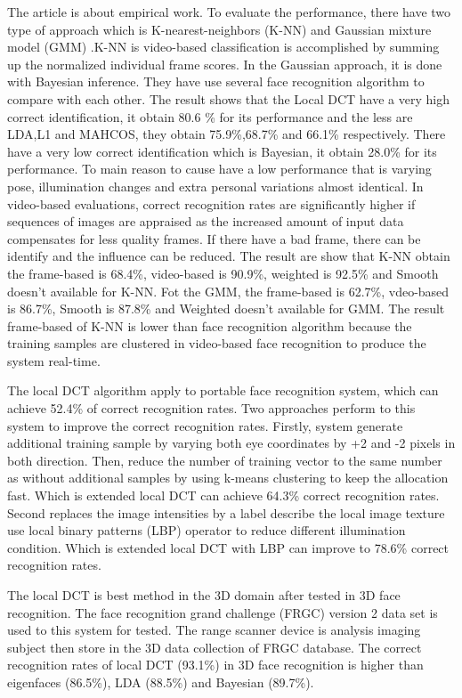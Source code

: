 \documentclass[a4paper,12pt]{article}
\begin{document}
The article is about empirical work. To evaluate the performance, there have two type of approach which is K-nearest-neighbors (K-NN) and Gaussian mixture model (GMM) .K-NN is video-based classification is accomplished by summing up the normalized individual frame scores. In the Gaussian approach, it is done with Bayesian inference.  They have use several face recognition algorithm to compare with each other. The result shows that the Local DCT have a very high correct identification, it obtain 80.6 \% for its performance and the less are LDA,L1 and MAHCOS, they obtain 75.9\%,68.7\% and 66.1\% respectively. There have a very low correct identification which is Bayesian, it obtain 28.0\% for its performance. To main reason to cause have a low performance that is varying pose, illumination changes and extra personal variations almost identical.
In video-based evaluations, correct recognition rates are significantly higher if sequences of images are appraised as the increased amount of input data compensates for less quality frames. If there have a bad frame, there can be identify and the influence can be reduced. The result are show that K-NN obtain the frame-based is 68.4\%, video-based is 90.9\%, weighted is 92.5\% and Smooth doesn’t available for K-NN. Fot the GMM, the frame-based is 62.7\%, vdeo-based is 86.7\%, Smooth is 87.8\% and Weighted doesn’t available for GMM. The result frame-based of K-NN is lower than face recognition algorithm because the training samples are clustered in video-based face recognition to produce the system real-time. 

The local DCT algorithm apply to portable face recognition system, which can achieve 52.4\% of correct recognition rates. Two approaches perform to this system to improve the correct recognition rates. Firstly, system generate additional training sample by varying both eye coordinates by +2 and -2 pixels in both direction. Then, reduce the number of training vector to the same number as without additional samples by using k-means clustering to keep the allocation fast. Which is extended local DCT can achieve 64.3\% correct recognition rates. Second replaces the image intensities by a label describe the local image texture use local binary patterns (LBP) operator to reduce different illumination condition. Which is extended local DCT with LBP can improve to 78.6\% correct recognition rates. 

The local DCT is best method in the 3D domain after tested in 3D face recognition.  The face recognition grand challenge (FRGC) version 2 data set is used to this system for tested. The range scanner device is analysis imaging subject then store in the 3D data collection of FRGC database. The correct recognition rates of local DCT (93.1\%) in 3D face recognition is higher than eigenfaces (86.5\%), LDA (88.5\%) and Bayesian (89.7\%). \\
\end{document}
